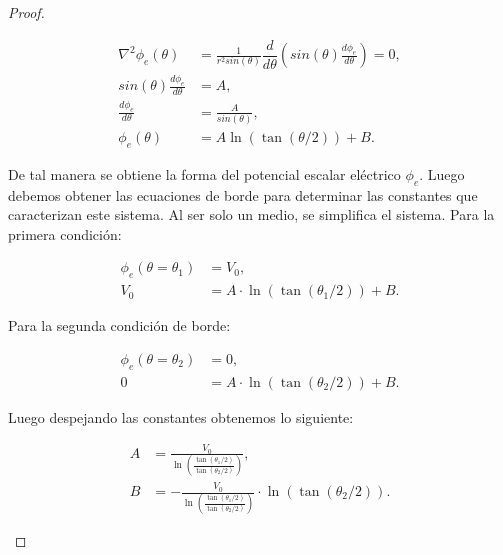 \begin{proof}
\begin{itemize}
        \begin{equation}
            \begin{aligned}
                \nabla^{2}\phi_{e}(\theta) &=  \frac{1}{r^{2}sin(\theta)}\dfrac{d}{d\theta}\left(sin(\theta) \frac{d\phi_{e}}{d\theta}\right) = 0, \\
                sin(\theta) \frac{d\phi_{e}}{d\theta} &= A, \\
                \frac{d\phi_{e}}{d\theta} &= \frac{A}{sin(\theta)}, \\
                \phi_{e}(\theta) &= A\ln\left(\tan( \theta/2) \right) + B.
            \end{aligned}
        \end{equation}
        
        De tal manera se obtiene la forma del potencial escalar eléctrico $\phi_{e}$. Luego debemos obtener las ecuaciones de borde para determinar las constantes que caracterizan este sistema. Al ser solo un medio, se simplifica el sistema. Para la primera condición:
        
        \begin{equation}
            \begin{aligned}
                \phi_{e}(\theta = \theta_{1}) &= V_{0}, \\
                V_{0} &= A \cdot \ln\left(\tan(\theta_{1}/2)\right) + B.
            \end{aligned}
        \end{equation}
        
        Para la segunda condición de borde:
        
        \begin{equation}
            \begin{aligned}
                \phi_{e}(\theta = \theta_{2}) &= 0, \\
                0 &= A\cdot \ln\left(\tan(\theta_{2}/2)\right) + B.
            \end{aligned}
        \end{equation}
        
        Luego despejando las constantes obtenemos lo siguiente:
        
        \begin{equation}
            \begin{aligned}
                A &= \frac{V_{0}}{\ln\left(\frac{\tan(\theta_{1}/2)}{\tan(\theta_{2}/2)}\right)}, \\
                B &=  -\frac{V_{0}}{\ln\left(\frac{\tan(\theta_{1}/2)}{\tan(\theta_{2}/2)}\right)} \cdot \ln\left(\tan(\theta_{2}/2)\right).
            \end{aligned}
        \end{equation}
        

\end{itemize}
\end{proof}
